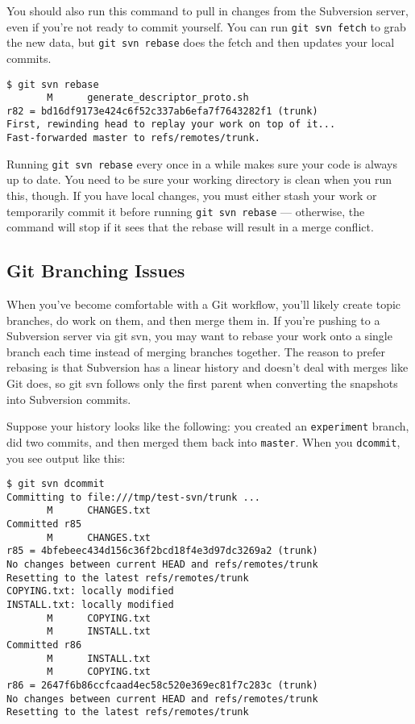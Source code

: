 \documentclass[a4paper]{book}
\newcounter{tab}[chapter]
\begin{document}
You should also run this command to pull in changes from the Subversion server, even if you're not ready to commit yourself. You can run \texttt{git svn fetch} to grab the new data, but \texttt{git svn rebase} does the fetch and then updates your local commits.

\begin{shaded}\begin{verbatim}
$ git svn rebase
       M      generate_descriptor_proto.sh
r82 = bd16df9173e424c6f52c337ab6efa7f7643282f1 (trunk)
First, rewinding head to replay your work on top of it...
Fast-forwarded master to refs/remotes/trunk.
\end{verbatim}\end{shaded}

Running \texttt{git svn rebase} every once in a while makes sure your code is always up to date. You need to be sure your working directory is clean when you run this, though. If you have local changes, you must either stash your work or temporarily commit it before running \texttt{git svn rebase} --- otherwise, the command will stop if it sees that the rebase will result in a merge conflict.

\subsection{Git Branching Issues}

When you've become comfortable with a Git workflow, you'll likely create topic branches, do work on them, and then merge them in. If you're pushing to a Subversion server via git svn, you may want to rebase your work onto a single branch each time instead of merging branches together. The reason to prefer rebasing is that Subversion has a linear history and doesn't deal with merges like Git does, so git svn follows only the first parent when converting the snapshots into Subversion commits.

Suppose your history looks like the following: you created an \texttt{experiment} branch, did two commits, and then merged them back into \texttt{master}. When you \texttt{dcommit}, you see output like this:

\begin{shaded}\begin{verbatim}
$ git svn dcommit
Committing to file:///tmp/test-svn/trunk ...
       M      CHANGES.txt
Committed r85
       M      CHANGES.txt
r85 = 4bfebeec434d156c36f2bcd18f4e3d97dc3269a2 (trunk)
No changes between current HEAD and refs/remotes/trunk
Resetting to the latest refs/remotes/trunk
COPYING.txt: locally modified
INSTALL.txt: locally modified
       M      COPYING.txt
       M      INSTALL.txt
Committed r86
       M      INSTALL.txt
       M      COPYING.txt
r86 = 2647f6b86ccfcaad4ec58c520e369ec81f7c283c (trunk)
No changes between current HEAD and refs/remotes/trunk
Resetting to the latest refs/remotes/trunk
\end{verbatim}\end{shaded}
\end{document}

